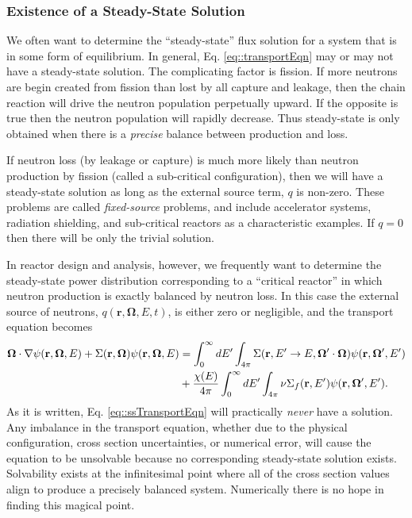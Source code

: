 \documentclass[11pt]{article}
\renewcommand\vec{\mathbf}
\begin{document}
\subsubsection{Existence of a Steady-State Solution}
\label{sec:orgheadline48}
We often want to determine the ``steady-state'' flux solution for a system that is in some form of equilibrium.  In general, Eq. \eqref{eq::transportEqn} may or may not have a steady-state solution.  The complicating factor is fission.  If more neutrons are begin created from fission than lost by all capture and leakage, then the chain reaction will drive the neutron population perpetually upward.  If the opposite is true then the neutron population will rapidly decrease.  Thus steady-state is only obtained when there is a \emph{precise} balance between production and loss.  

If neutron loss (by leakage or capture) is much more likely than neutron production by fission (called a sub-critical configuration), then we will have a steady-state solution as long as the external source term, \(q\) is non-zero.  These problems are called \emph{fixed-source} problems, and include accelerator systems, radiation shielding, and sub-critical reactors as a characteristic examples.  If \(q=0\) then there will be only the trivial solution.

In reactor design and analysis, however, we frequently want to determine the steady-state power distribution corresponding to a ``critical reactor'' in which neutron production is exactly balanced by neutron loss.  In this case the external source of neutrons, \(q(\vec{r},\vec{\Omega},E,t)\), is either zero or negligible, and the transport equation becomes
\begin{align}
  \vec{\Omega} \cdot \nabla\psi(\vec{r},\vec{\Omega},E)
  + \Sigma(\vec{r},\vec{\Omega}) \psi(\vec{r},\vec{\Omega},E)
  &= \int_0^\infty dE' \int_{4\pi} \Sigma(\vec{r},E' \rightarrow E, \vec{\Omega}'\cdot\vec{\Omega}) \psi(\vec{r},\vec{\Omega}',E') \notag\\
  &+ \frac{\chi(E)}{4\pi} \int_0^\infty dE' \int_{4\pi} \nu\Sigma_f(\vec{r},E') \psi(\vec{r},\vec{\Omega}',E').
  \label{eq::ssTransportEqn}
\end{align}
As it is written, Eq. \eqref{eq::ssTransportEqn} will practically \emph{never} have a solution.  Any imbalance in the transport equation, whether due to the physical configuration, cross section uncertainties, or numerical error, will cause the equation to be unsolvable because no corresponding steady-state solution exists.  Solvability exists at the infinitesimal point where all of the cross section values align to produce a precisely balanced system.  Numerically there is no hope in finding this magical point.
\end{document}
